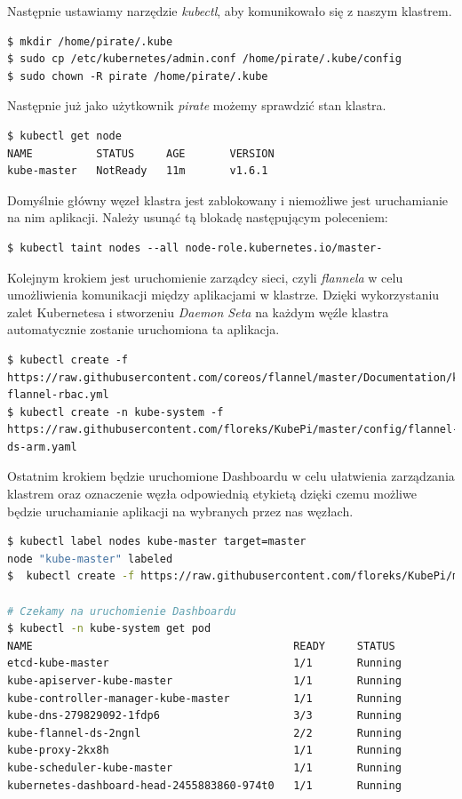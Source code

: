 \documentclass[12pt]{report}
\begin{document}
{Następnie ustawiamy narzędzie \textit{kubectl}, aby komunikowało się z naszym klastrem.

\begin{lstlisting}
$ mkdir /home/pirate/.kube
$ sudo cp /etc/kubernetes/admin.conf /home/pirate/.kube/config
$ sudo chown -R pirate /home/pirate/.kube
\end{lstlisting}

Następnie już jako użytkownik \textit{pirate} możemy sprawdzić stan klastra.

\begin{lstlisting}[float,floatplacement=H]
$ kubectl get node
NAME          STATUS     AGE       VERSION
kube-master   NotReady   11m       v1.6.1
\end{lstlisting}

Domyślnie główny węzeł klastra jest zablokowany i niemożliwe jest uruchamianie na nim aplikacji. Należy usunąć tą blokadę następującym poleceniem:

\begin{lstlisting}
$ kubectl taint nodes --all node-role.kubernetes.io/master-
\end{lstlisting}

Kolejnym krokiem jest uruchomienie zarządcy sieci, czyli \textit{flannela} w celu umożliwienia komunikacji między aplikacjami w klastrze. Dzięki wykorzystaniu zalet Kubernetesa i stworzeniu \textit{Daemon Seta} na każdym węźle klastra automatycznie zostanie uruchomiona ta aplikacja.

\begin{lstlisting}
$ kubectl create -f https://raw.githubusercontent.com/coreos/flannel/master/Documentation/kube-flannel-rbac.yml
$ kubectl create -n kube-system -f https://raw.githubusercontent.com/floreks/KubePi/master/config/flannel-ds-arm.yaml
\end{lstlisting}

Ostatnim krokiem będzie uruchomione Dashboardu w celu ułatwienia zarządzania klastrem oraz oznaczenie węzła odpowiednią etykietą dzięki czemu możliwe będzie uruchamianie aplikacji na wybranych przez nas węzłach. 

\begin{lstlisting}[language=bash]
$ kubectl label nodes kube-master target=master
node "kube-master" labeled
$  kubectl create -f https://raw.githubusercontent.com/floreks/KubePi/master/config/dashboard-arm.yaml

# Czekamy na uruchomienie Dashboardu
$ kubectl -n kube-system get pod
NAME                                         READY     STATUS
etcd-kube-master                             1/1       Running
kube-apiserver-kube-master                   1/1       Running
kube-controller-manager-kube-master          1/1       Running
kube-dns-279829092-1fdp6                     3/3       Running
kube-flannel-ds-2ngnl                        2/2       Running
kube-proxy-2kx8h                             1/1       Running
kube-scheduler-kube-master                   1/1       Running
kubernetes-dashboard-head-2455883860-974t0   1/1       Running


\end{lstlisting}}
\end{document}
